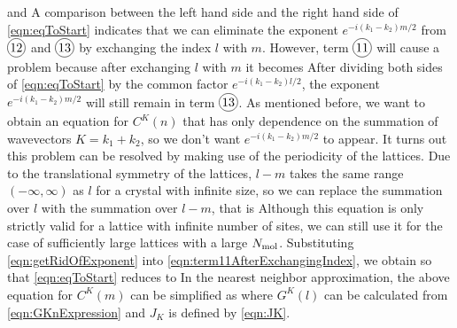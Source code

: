 and 
A comparison between the left hand side and the right hand side of \autoref{eqn:eqToStart} indicates that 
we can eliminate the exponent $e^{- i (k_1 - k_2 ) m /2}$ from $\text{\circled{12}}$ and $\text{\circled{13}}$ by
 exchanging the index $l$ with $m$. However, term $\text{\circled{11}}$ will cause a problem because after 
exchanging $l$ with $m$ it becomes
After dividing both sides of \autoref{eqn:eqToStart} by the common factor $e^{- i (k_1 - k_2 ) l /2}$, the exponent
$e^{-i(k_1 - k_2 )m/2}$ will still remain in term  $\text{\circled{13}}$. As mentioned before, we want to obtain an 
equation for $C^{K}(n)$ that has only dependence on the summation of wavevectors $K = k_1 + k_2$, so we don't 
want $e^{-i(k_1 - k_2 )m/2}$ to appear. It turns out this problem can be resolved by making use of the periodicity of
 the lattices. Due to the translational symmetry of the lattices, $l-m$ takes the same range $(-\infty, \infty)$ as $l$ for
a crystal with infinite size, so we can replace the summation over $l$ with the summation over $l-m$, that is
Although this equation is only strictly valid for a lattice with infinite number of sites, we can still use it for the case
of sufficiently large lattices with a large $N_{\rm mol}$.  Substituting \autoref{eqn:getRidOfExponent} into 
\autoref{eqn:term11AfterExchangingIndex}, we obtain
so that  \autoref{eqn:eqToStart} reduces to
In the nearest neighbor approximation, the above equation for $C^{K}(m)$ can be simplified as
where  $G^{K}(l)$ can be calculated from \autoref{eqn:GKnExpression} and $J_K$ is defined by \autoref{eqn:JK}. 

